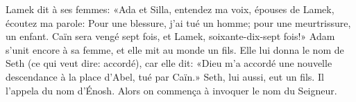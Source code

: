 Lamek dit à ses femmes: «Ada et Silla, entendez ma voix,
	épouses de Lamek, écoutez ma parole:
	Pour une blessure, j’ai tué un homme; pour une meurtrissure, un enfant.
Caïn sera vengé sept fois, et Lamek, soixante-dix-sept fois!»
Adam s’unit encore à sa femme, et elle mit au monde un fils.
Elle lui donna le nom de Seth (ce qui veut dire: accordé),
	car elle dit: «Dieu m’a accordé une nouvelle descendance
	à la place d’Abel, tué par Caïn.»
Seth, lui aussi, eut un fils. Il l’appela du nom d’Énosh.
	Alors on commença à invoquer le nom du Seigneur.
